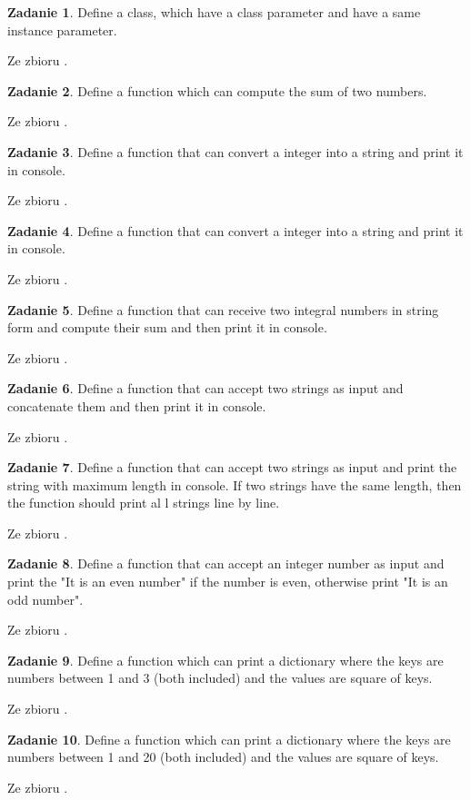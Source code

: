 \documentclass[11pt]{article}
\theoremstyle{definition}
\newtheorem{zadanie}{Zadanie}
\newcommand{\fromA}{\small Ze zbioru \cite{python100}.}
\begin{document}
\begin{zadanie}
Define a class, which have a class parameter and have a same instance parameter.

\fromA
\end{zadanie}
\begin{zadanie}
Define a function which can compute the sum of two numbers.

\fromA
\end{zadanie}
\begin{zadanie}
Define a function that can convert a integer into a string and print it in console.

\fromA
\end{zadanie}
\begin{zadanie}
Define a function that can convert a integer into a string and print it in console.

\fromA
\end{zadanie}
\begin{zadanie}
Define a function that can receive two integral numbers in string form and compute their sum and then print it in console.

\fromA
\end{zadanie}
\begin{zadanie}
Define a function that can accept two strings as input and concatenate them and then print it in console.

\fromA
\end{zadanie}
\begin{zadanie}
Define a function that can accept two strings as input and print the string with maximum length in console. If two strings have the same length, then the function should print al l strings line by line.

\fromA
\end{zadanie}
\begin{zadanie}
Define a function that can accept an integer number as input and print the "It is an even number" if the number is even, otherwise print "It is an odd number".

\fromA
\end{zadanie}
\begin{zadanie}
Define a function which can print a dictionary where the keys are numbers between 1 and 3 (both included) and the values are square of keys.

\fromA
\end{zadanie}
\begin{zadanie}
Define a function which can print a dictionary where the keys are numbers between 1 and 20 (both included) and the values are square of keys.

\fromA
\end{zadanie}
\end{document}

